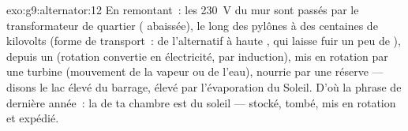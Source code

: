 \begin{solution}{exo:g9:alternator:12}
En remontant~: les \qty{230}{V} du mur sont passés par le
transformateur de quartier ( abaissée), le long des pylônes à
des centaines de kilovolts (forme de transport~: de l'alternatif à
haute , qui laisse fuir un peu de ), depuis un
 (rotation convertie en électricité, par induction), mis
en rotation par une turbine (mouvement de la vapeur ou de l'eau),
nourrie par une réserve --- disons le lac élevé du barrage, élevé par
l'évaporation du Soleil. D'où la phrase de dernière année~: la 
de ta chambre est du soleil --- stocké, tombé, mis en rotation et
expédié.
\end{solution}

